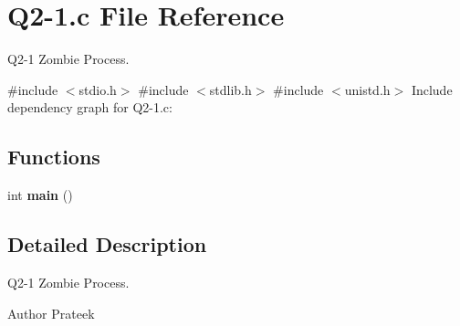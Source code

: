 \hypertarget{Q2-1_8c}{}\section{Q2-\/1.c File Reference}
\label{Q2-1_8c}


Q2-\/1  Zombie Process.  


{\ttfamily \#include $<$stdio.\+h$>$}\newline
{\ttfamily \#include $<$stdlib.\+h$>$}\newline
{\ttfamily \#include $<$unistd.\+h$>$}\newline
Include dependency graph for Q2-\/1.c\+:
\subsection*{Functions}
\begin{DoxyCompactItemize}
\item 
\mbox{\label{Q2-1_8c_ae66f6b31b5ad750f1fe042a706a4e3d4}} 
int {\bfseries main} ()
\end{DoxyCompactItemize}


\subsection{Detailed Description}
Q2-\/1  Zombie Process. 

\begin{DoxyAuthor}{Author}
Prateek 
\end{DoxyAuthor}
